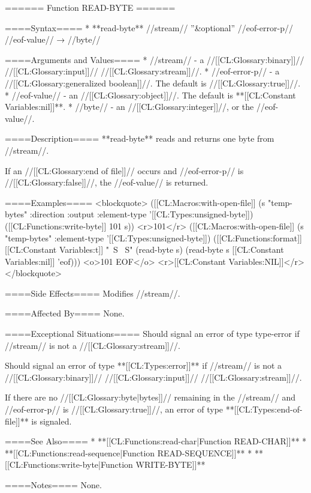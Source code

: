 ====== Function READ-BYTE ======

====Syntax====
  * **read-byte** //stream// ''&optional'' //eof-error-p// //eof-value// → //byte//

====Arguments and Values====
  * //stream// - a //[[CL:Glossary:binary]]// //[[CL:Glossary:input]]// //[[CL:Glossary:stream]]//.
  * //eof-error-p// - a //[[CL:Glossary:generalized boolean]]//. The default is //[[CL:Glossary:true]]//.
  * //eof-value// - an //[[CL:Glossary:object]]//. The default is **[[CL:Constant Variables:nil]]**.
  * //byte// - an //[[CL:Glossary:integer]]//, or the //eof-value//.

====Description====
**read-byte** reads and returns one byte from //stream//.

If an //[[CL:Glossary:end of file]]// occurs and //eof-error-p// is //[[CL:Glossary:false]]//, the //eof-value// is returned.

====Examples==== 
<blockquote> 
([[CL:Macros:with-open-file]] (s "temp-bytes" :direction :output 
                                :element-type '[[CL:Types:unsigned-byte]]) 
  ([[CL:Functions:write-byte]] 101 s)) <r>101</r>
([[CL:Macros:with-open-file]] (s "temp-bytes" :element-type '[[CL:Types:unsigned-byte]]) 
  ([[CL:Functions:format]] [[CL:Constant Variables:t]] "~S ~S" 
          (read-byte s)
          (read-byte s [[CL:Constant Variables:nil]] 'eof)))
<o>101 EOF</o>
<r>[[CL:Constant Variables:NIL]]</r>
</blockquote>

====Side Effects====
Modifies //stream//.

====Affected By====
None.

====Exceptional Situations====
Should signal an error of type type-error if //stream// is not a //[[CL:Glossary:stream]]//.

Should signal an error of type **[[CL:Types:error]]** if //stream// is not a //[[CL:Glossary:binary]]// //[[CL:Glossary:input]]// //[[CL:Glossary:stream]]//.

If there are no //[[CL:Glossary:byte|bytes]]// remaining in the //stream// and //eof-error-p// is //[[CL:Glossary:true]]//, an error of type **[[CL:Types:end-of-file]]** is signaled.

====See Also====
  * **[[CL:Functions:read-char|Function READ-CHAR]]**
  * **[[CL:Functions:read-sequence|Function READ-SEQUENCE]]**
  * **[[CL:Functions:write-byte|Function WRITE-BYTE]]**

====Notes====
None.

 
